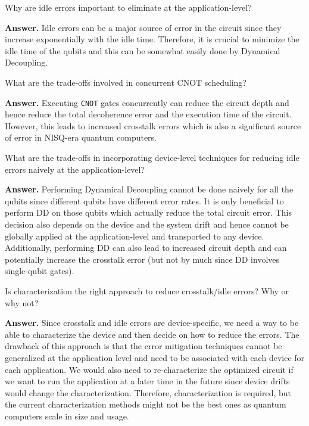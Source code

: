 \begin{question}
    Why are idle errors important to eliminate at the application-level?
\end{question}
\textbf{Answer.} Idle errors can be a major source of error in the circuit since they increase exponentially with the idle time. Therefore, it is crucial to minimize the idle time of the qubits and this can be somewhat easily done by Dynamical Decoupling.

\tcbline{}

\begin{question}
    What are the trade-offs involved in concurrent CNOT scheduling?
\end{question}
\textbf{Answer.} Executing \texttt{CNOT} gates concurrently can reduce the circuit depth and hence reduce the total decoherence error and the execution time of the circuit. However, this leads to increased crosstalk errors which is also a significant source of error in NISQ-era quantum computers.

\tcbline{}

\begin{question}
    What are the trade-offs in incorporating device-level techniques for reducing idle errors naively at the application-level?
\end{question}
\textbf{Answer.} Performing Dynamical Decoupling cannot be done naively for all the qubits since different qubits have different error rates. It is only beneficial to perform DD on those qubits which actually reduce the total circuit error. This decision also depends on the device and the system drift and hence cannot be globally applied at the application-level and transported to any device. Additionally, performing DD can also lead to increased circuit depth and can potentially increase the crosstalk error (but not by much since DD involves single-qubit gates).

\tcbline{}

\begin{question}
    Is characterization the right approach to reduce crosstalk/idle errors? Why or why not?
\end{question}
\textbf{Answer.} Since crosstalk and idle errors are device-specific, we need a way to be able to characterize the device and then decide on how to reduce the errors. The drawback of this approach is that the error mitigation techniques cannot be generalized at the application level and need to be associated with each device for each application. We would also need to re-characterize the optimized circuit if we want to run the application at a later time in the future since device drifts would change the characterization. Therefore, characterization is required, but the current characterization methods might not be the best ones as quantum computers scale in size and usage.